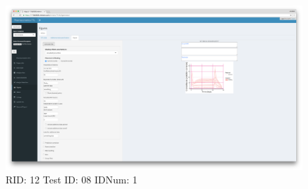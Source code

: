 \begin{figure}[H]
\includegraphics[width=.8\textwidth]{screencaps/12-08-1.png}
\caption{RID: 12 Test ID: 08 IDNum: 1}
\end{figure}
